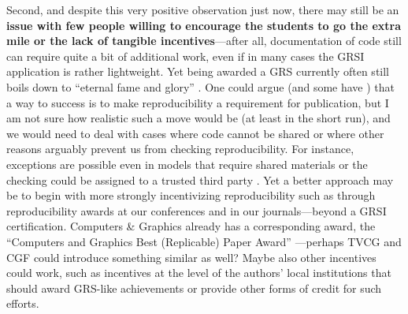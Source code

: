 \documentclass[conference,svgnames]{vgtc}                     %
\begin{document}
Second, and despite this very positive observation just now, there may still be an \textbf{issue with few people willing to encourage the students to go the extra mile or the lack of tangible incentives}---after all, documentation of code still can require quite a bit of additional work, even if in many cases the GRSI application is rather lightweight. Yet being awarded a GRS currently often still boils down to ``eternal fame and glory'' \cite{Isenberg:2022:PEP}. One could argue (and some have \cite{Haroz:2018:OPV}) that a way to success is to make reproducibility a requirement for publication, but I am not sure how realistic such a move would be (at least in the short run), and we would need to deal with cases where code cannot be shared or where other reasons arguably prevent us from checking reproducibility. For instance, exceptions are possible even in models that require shared materials \cite{Haroz:2018:OPV} or the checking could be assigned to a trusted third party \cite{Besancon:2021:OSS}. Yet a better approach may be to begin with more strongly incentivizing reproducibility such as through reproducibility awards at our conferences and in our journals---beyond a GRSI certification. Computers \& Graphics already has a corresponding award, the ``Computers and Graphics Best (Replicable) Paper Award'' \cite{Jorge:2020:NEC}---perhaps TVCG and CGF could introduce something similar as well? Maybe also other incentives could work, such as incentives at the level of the authors' local institutions that should award GRS-like achievements or provide other forms of credit for such efforts.
\end{document}
